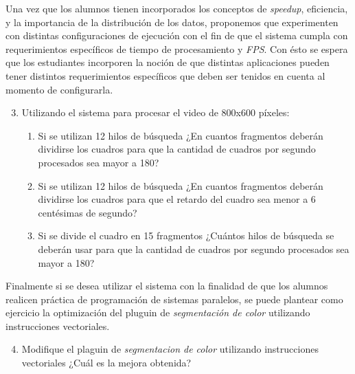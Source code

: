Una vez que los alumnos tienen incorporados los conceptos de \emph{speedup},
eficiencia, y la importancia de la distribución de los datos, proponemos que
experimenten con distintas configuraciones de ejecución con el fin de que el
sistema cumpla con requerimientos específicos de tiempo de procesamiento y
\emph{FPS}. Con ésto se espera que los estudiantes incorporen la noción de que
distintas aplicaciones pueden tener distintos requerimientos específicos que
deben ser tenidos en cuenta al momento de configurarla.

\begin{enumerate}

	\setcounter{enumi}{2}

	\item{Utilizando el sistema para procesar el video de 800x600 píxeles:

\begin{enumerate}

	\item{Si se utilizan 12 hilos de búsqueda ¿En cuantos fragmentos deberán
		dividirse los cuadros para que la cantidad de cuadros por
		segundo procesados sea mayor a 180?}

	\item{Si se utilizan 12 hilos de búsqueda ¿En cuantos fragmentos deberán
		dividirse los cuadros para que el retardo del cuadro sea menor a
		6 centésimas de segundo?}

	\item{Si se divide el cuadro en 15 fragmentos ¿Cuántos hilos de búsqueda
		se deberán usar para que la cantidad de cuadros por segundo
		procesados sea mayor a 180?}

\end{enumerate}}

\end{enumerate}

Finalmente si se desea utilizar el sistema con la finalidad de que los alumnos
realicen práctica de programación de sistemas paralelos, se puede plantear como
ejercicio la optimización del pluguin de \emph{segmentación de color} utilizando
instrucciones vectoriales.

\begin{enumerate}

	\setcounter{enumi}{3}

	\item{Modifique el plaguin de \emph{segmentacion de color} utilizando
	instrucciones vectoriales ¿Cuál es la mejora obtenida?}

\end{enumerate}

